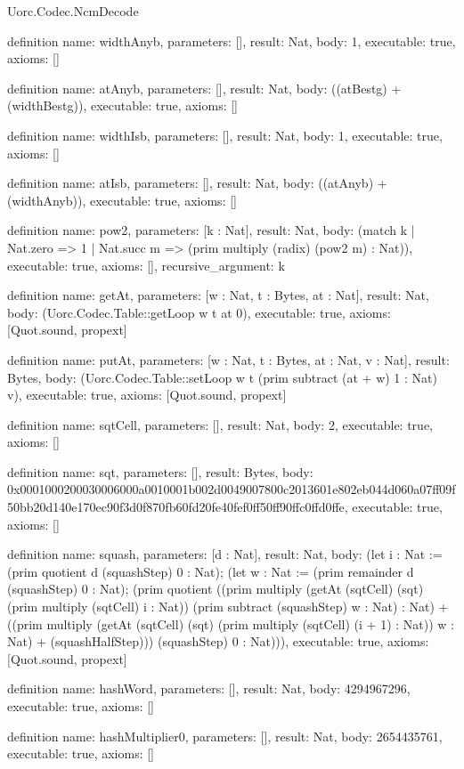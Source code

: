 \begin{lexlean}{Uorc.Codec.NcmDecode}
\begin{semanticmodule}
definition{
  name: widthAnyb,
  parameters: [],
  result: Nat,
  body: 1,
  executable: true,
  axioms: []
}

definition{
  name: atAnyb,
  parameters: [],
  result: Nat,
  body: ((atBestg) + (widthBestg)),
  executable: true,
  axioms: []
}

definition{
  name: widthIsb,
  parameters: [],
  result: Nat,
  body: 1,
  executable: true,
  axioms: []
}

definition{
  name: atIsb,
  parameters: [],
  result: Nat,
  body: ((atAnyb) + (widthAnyb)),
  executable: true,
  axioms: []
}

definition{
  name: pow2,
  parameters: [k : Nat],
  result: Nat,
  body: (match k
    | Nat.zero => 1
    | Nat.succ m => (prim multiply (radix) (pow2 m) : Nat)),
  executable: true,
  axioms: [],
  recursive_argument: k
}

definition{
  name: getAt,
  parameters: [w : Nat, t : Bytes, at : Nat],
  result: Nat,
  body: (Uorc.Codec.Table::getLoop w t at 0),
  executable: true,
  axioms: [Quot.sound, propext]
}

definition{
  name: putAt,
  parameters: [w : Nat, t : Bytes, at : Nat, v : Nat],
  result: Bytes,
  body: (Uorc.Codec.Table::setLoop w t (prim subtract (at + w) 1 : Nat) v),
  executable: true,
  axioms: [Quot.sound, propext]
}

definition{
  name: sqtCell,
  parameters: [],
  result: Nat,
  body: 2,
  executable: true,
  axioms: []
}

definition{
  name: sqt,
  parameters: [],
  result: Bytes,
  body: 0x0001000200030006000a0010001b002d0049007800c2013601e802eb044d060a07ff09f50bb20d140e170ec90f3d0f870fb60fd20fe40fef0ff50ff90ffc0ffd0ffe,
  executable: true,
  axioms: []
}

definition{
  name: squash,
  parameters: [d : Nat],
  result: Nat,
  body: (let i : Nat := (prim quotient d (squashStep) 0 : Nat); (let w : Nat := (prim remainder d (squashStep) 0 : Nat); (prim quotient ((prim multiply (getAt (sqtCell) (sqt) (prim multiply (sqtCell) i : Nat)) (prim subtract (squashStep) w : Nat) : Nat) + ((prim multiply (getAt (sqtCell) (sqt) (prim multiply (sqtCell) (i + 1) : Nat)) w : Nat) + (squashHalfStep))) (squashStep) 0 : Nat))),
  executable: true,
  axioms: [Quot.sound, propext]
}

definition{
  name: hashWord,
  parameters: [],
  result: Nat,
  body: 4294967296,
  executable: true,
  axioms: []
}

definition{
  name: hashMultiplier0,
  parameters: [],
  result: Nat,
  body: 2654435761,
  executable: true,
  axioms: []
}


\end{semanticmodule}
\end{lexlean}
